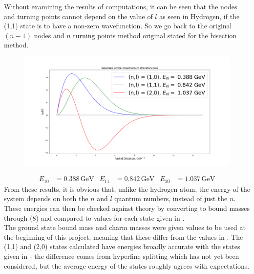 \documentclass[landscape,a2paper,fontscale=0.65]{baposter}
\begin{document}
\begin{poster}
{    Without examining the results of computations, it can be seen that the nodes and turning points cannot depend on the value of $l$ as seen in Hydrogen, if the (1,1) state is to have a non-zero wavefunction. 
    So we go back to the original $(n-1)$ nodes and $n$ turning points method original stated for the bisection method.
    \begin{figure}[H]
        \centering
        \includegraphics[width=\linewidth]{Charmonium}
    \end{figure}
    \vspace{-15pt}
    \begin{align}
        E_{10} &= 0.388\,\text{GeV} & E_{11} &= 0.842\,\text{GeV} & E_{20} &= 1.037\,\text{GeV}
    \end{align}
    From these results, it is obvious that, unlike the hydrogen atom, the energy of the system depends on both the $n$ and $l$ quantum numbers, instead of just the $n$.\\
    These energies can then be checked against theory by converting to bound masses through (8) and compared to values for each state given in \cite{website:pdg}. \\
    The ground state bound mass and charm masses were given values to be used at the beginning of this project, meaning that these differ from the values in \cite{website:pdg}. 
    The (1,1) and (2,0) states calculated have energies broadly accurate with the states given in \cite{website:pdg} - the difference comes from hyperfine splitting which has not yet been considered, but the average energy of the states roughly agrees with expectations.
}


\end{poster}
\end{document}
